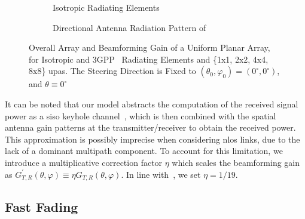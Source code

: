  \begin{figure}
  \centering
  \begin{subfigure}[t]{\columnwidth}
    \centering 
    \setlength{}
    \setlength{}
    
    \caption{Isotropic Radiating Elements}
    \vspace*{2mm}
    \label{fig:pattern_iso}
  \end{subfigure}
 \hfill
  \begin{subfigure}[t]{\columnwidth}
    \centering 
    \setlength{}
    \setlength{}
    
    \caption{Directional Antenna Radiation Pattern of~\cite[Section~7.3]{TR38901}}
    \label{fig:pattern_3gpp}
  \end{subfigure}
  \caption{Overall Array and Beamforming Gain of a Uniform Planar Array, for Isotropic and 3GPP~\cite[Section~7.3]{TR38901} Radiating Elements and \{1x1, 2x2, 4x4, 8x8\} \glspl{upa}. The Steering Direction is Fixed to $\left(\theta_0, \varphi_0\right) = (0^{\circ}, 0^{\circ})$, and $\theta \equiv 0^{\circ}$}
  \label{Fig:rad_pattern}
\end{figure}

It can be noted that our model abstracts the computation of the received signal power as a \gls{siso} keyhole channel~\cite{chizhik2000capacities}, which is then combined with the spatial antenna gain
patterns at the transmitter/receiver to obtain the received power. This approximation is possibly imprecise when considering \gls{nlos} links, due to the lack of a dominant multipath component. To account for this limitation, we introduce a multiplicative correction factor $\eta$ which scales the beamforming gain as $G^{'}_{T, R}(\theta, \varphi) \equiv \eta G_{T, R}(\theta, \varphi) $. In line with~\cite{kulkarni2018correction}, we set $\eta = 1 / 19$.

\subsection{Fast Fading}


